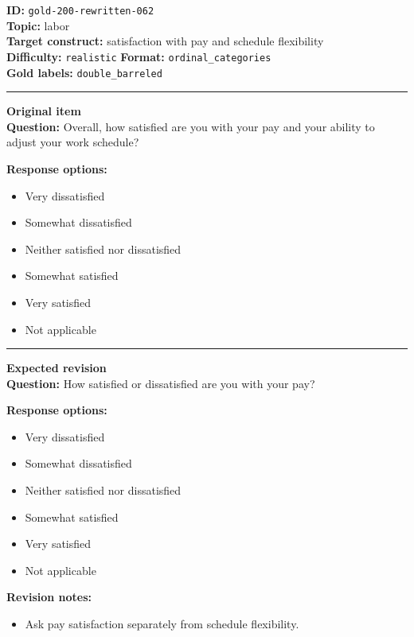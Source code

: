 \documentclass[10pt,a4paper]{article}
\newcommand{\sectionline}{\vspace{0.15em}\hrule\vspace{0.35em}}
\begin{document}
\begin{tcolorbox}[colframe=FlawRed,colback=white,colbacktitle=FlawRed!9,coltitle=black,title={Item 062\hfill Flawed item}]
\textbf{ID:} \texttt{gold-200-rewritten-062}\\
\textbf{Topic:} labor\\
\textbf{Target construct:} satisfaction with pay and schedule flexibility\\
\textbf{Difficulty:} \texttt{realistic} \quad \textbf{Format:} \texttt{ordinal\_categories}\\
\textbf{Gold labels:} \texttt{double\_barreled}\\
\sectionline
\textbf{Original item}\\
\textbf{Question:} Overall, how satisfied are you with your pay and your ability to adjust your work schedule?
\par\textbf{Response options:}
\begin{itemize}
\item Very dissatisfied
\item Somewhat dissatisfied
\item Neither satisfied nor dissatisfied
\item Somewhat satisfied
\item Very satisfied
\item Not applicable
\end{itemize}
\sectionline
\textbf{Expected revision}\\
\textbf{Question:} How satisfied or dissatisfied are you with your pay?
\par\textbf{Response options:}
\begin{itemize}
\item Very dissatisfied
\item Somewhat dissatisfied
\item Neither satisfied nor dissatisfied
\item Somewhat satisfied
\item Very satisfied
\item Not applicable
\end{itemize}
\par\textbf{Revision notes:}
\begin{itemize}
\item Ask pay satisfaction separately from schedule flexibility.
\end{itemize}
\end{tcolorbox}
\end{document}

